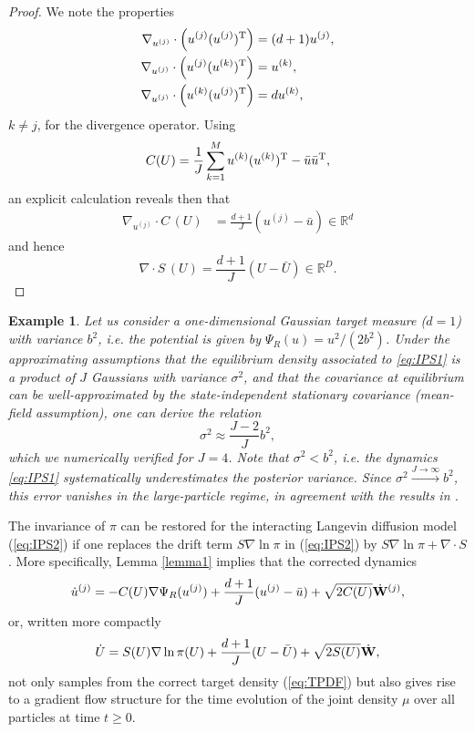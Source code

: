 \documentclass[11pt]{article}
\newtheorem{example}[theorem]{Example}
\begin{document}
\begin{proof} We note the properties 
\begin{align}
\nabla_{u^{(j)}} \cdot \left( u^{(j)} (u^{(j)})^{\rm T}\right) &= (d+1) u^{(j)},\\
\nabla_{u^{(j)}} \cdot \left( u^{(j)} (u^{(k)})^{\rm T}\right) &= u^{(k)},\\
\nabla_{u^{(j)}} \cdot \left( u^{(k)} (u^{(j)})^{\rm T}\right) &= d u^{(k)},
\end{align}
$k\not=j$, for the divergence operator. Using
\begin{equation}
C(U) = \frac{1}{J} \sum_{k=1}^M u^{(k)} (u^{(k)})^{\rm T} - \bar u \bar u^{\rm T},
\end{equation}
an explicit calculation reveals then that
\begin{align}
\nabla_{u^{(j)}} \cdot C\,(U) &= 
\frac{d+1}{J} (u^{(j)} - \bar u)  \in \mathbb{R}^d
\end{align}
and hence 
\begin{equation}
\nabla \cdot S \,(U) = \frac{d+1}{J}\left(U-\bar U\right) \in \mathbb{R}^D.
\end{equation}

\end{proof}

\begin{example} Let us consider a one-dimensional Gaussian target measure ($d=1$) with variance $b^2$, i.e. the potential is given by $\Psi_R(u) =  u^2/(2b^2)$. Under the approximating assumptions that the equilibrium density associated to \eqref{eq:IPS1} is a product of $J$ Gaussians with variance $\sigma^2$, and that the covariance at equilibrium can be well-approximated by the state-independent stationary covariance (mean-field assumption),  one can derive the  relation 
\begin{equation}
\sigma^2 \approx \frac{J-2}{J} b^2,
\end{equation}	
which we numerically verified for $J=4$. Note that $\sigma^2 < b^2$, i.e.
the dynamics \eqref{eq:IPS1} systematically underestimates the posterior variance. Since $ \sigma^2 \xrightarrow{J \rightarrow \infty} b^2$, this error vanishes in the large-particle regime, in agreement with the results in \cite{sr:GIHLS19}.
\end{example}

The invariance of $\pi$ can be restored for the interacting Langevin diffusion model (\ref{eq:IPS2}) 
if one replaces the drift term $S \nabla \ln \pi$ in (\ref{eq:IPS2}) by $S \nabla \ln \pi + \nabla \cdot S$. More specifically, 
Lemma \ref{lemma1} implies that the corrected dynamics
\begin{equation} \label{eq:IPS1c}
\dot{u}^{(j)} = -C(U)\nabla \Psi_R(u^{(j)}) + \frac{d+1}{J} (u^{(j)}-\bar u) + \sqrt{2C(U)} \dot{\bf W}^{(j)},
\end{equation}
or, written more compactly
\begin{equation} \label{eq:IPS2c}
\dot{U} = S(U)\nabla \ln \pi(U) + \frac{d+1}{J}(U-\bar U) + \sqrt{2S(U)}\dot{\bf W},
\end{equation}
not only samples from the correct target density (\ref{eq:TPDF}) but also 
gives rise to a gradient flow structure for the time evolution of the joint density $\mu$ over all particles at time $t \ge 0$.
\end{document}
